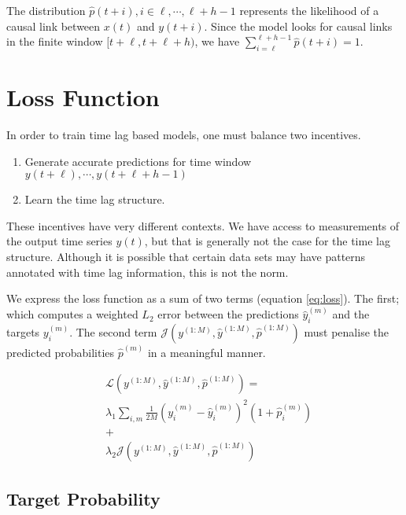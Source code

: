 \documentclass[twoside]{article}
\begin{document}
The distribution $\hat{p}(t+i), i \in {\ell, \cdots, \ell+h-1}$ represents the 
likelihood of a causal link between $x(t)$ and $y(t+i)$. Since the model looks
for causal links in the finite window $[t+\ell, t+\ell+h)$, we have 
$\sum^{\ell+h-1}_{i = \ell}{\hat{p}(t + i)} = 1$.


\section{Loss Function}

In order to train time lag based models, one must balance two incentives.

\begin{enumerate}
    \item Generate accurate predictions for time window $y(t+\ell), \cdots, y(t+\ell+h-1)$
    \item Learn the time lag structure.
\end{enumerate}

These incentives have very different contexts. We have access to measurements of the output
time series $y(t)$, but that is generally not the case for the time lag structure. Although
it is possible that certain data sets may have patterns annotated with time lag information, 
this is not the norm.

We express the loss function as a sum of two terms (equation \ref{eq:loss}). The first; which computes a weighted $L_2$ 
error between the predictions $\hat{y}^{(m)}_{i}$ and the targets $y^{(m)}_{i}$. The second term
$\mathcal{J}(y^{(1:M)}, \hat{y}^{(1:M)}, \hat{p}^{(1:M)})$ must penalise the predicted probabilities
$\hat{p}^{(m)}$ in a meaningful manner.

\begin{equation}\label{eq:loss}
\begin{aligned}
&\mathcal{L}(y^{(1:M)}, \hat{y}^{(1:M)}, \hat{p}^{(1:M)}) = \\
&\lambda_1 \sum_{i,m}{\frac{1}{2M} (y^{(m)}_{i} - \hat{y}^{(m)}_{i})^2 (1 + \hat{p}^{(m)}_i)} \\ 
&+ \\ 
&\lambda_2 \mathcal{J}(y^{(1:M)}, \hat{y}^{(1:M)}, \hat{p}^{(1:M)})
\end{aligned}
\end{equation}

\subsection{Target Probability}
\end{document}
